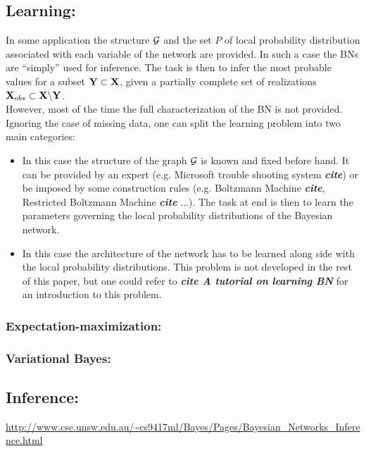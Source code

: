 \documentclass[a4paper,11pt]{report}
\begin{document}
    \subsection{Learning:}
      \label{subsec:PGMs/BN/Learning}
      
      In some application the structure $\mathcal{G}$ and the set $P$ of local probability distribution associated with each variable of the network are provided. In such a case the BNs are ``simply'' used for inference. The task is then to infer the most probable values for a subset ${\bf Y} \subset {\bf X}$, given a partially complete set of realizations ${\bf X}_{obs} \subset {\bf X} \backslash {\bf Y}$.\\
      
      However, most of the time the full characterization of the BN is not provided. Ignoring the case of missing data, one can split the learning problem into two main categories:
      \begin{itemize}
				\item {} In this case the structure of the graph $\mathcal{G}$ is known and fixed before hand. It can be provided by an expert (e.g. Microsoft trouble shooting system \textbf{\textit{cite}}) or be imposed by some construction rules (e.g. Boltzmann Machine \textbf{\textit{cite}}, Restricted Boltzmann Machine \textbf{\textit{cite}} ...). The task at end is then to learn the parameters governing the local probability distributions of the Bayesian network.
        \item {} In this case the architecture of the network has to be learned along side with the local probability distributions. This problem is not developed in the rest of this paper, but one could refer to \textbf{\textit{cite A tutorial on learning BN}} for an introduction to this problem.
      \end{itemize}
      
      \subsubsection{Expectation-maximization:}
      
      \subsubsection{Variational Bayes:}

    \subsection{Inference:}
      \label{subsec:PGMs/BN/Inference}
      \url{http://www.cse.unsw.edu.au/~cs9417ml/Bayes/Pages/Bayesian_Networks_Inference.html}
      
\end{document}
